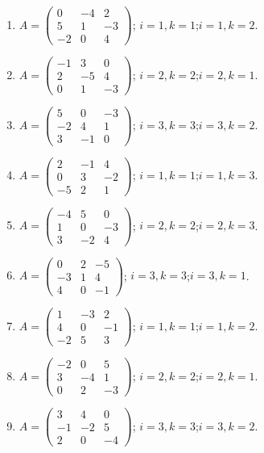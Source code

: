 \begin{enumerate}[label=\arabic*.,  leftmargin=*]
\item $A=\begin{pmatrix}0&-4&2\\5&1&-3\\-2&0&4\end{pmatrix}$; \quad $i=1, k=1$;\quad $i=1, k=2$.
\item $A=\begin{pmatrix}-1&3&0\\2&-5&4\\0&1&-3\end{pmatrix}$; \quad $i=2, k=2$;\quad $i=2, k=1$.
\item $A=\begin{pmatrix}5&0&-3\\-2&4&1\\3&-1&0\end{pmatrix}$; \quad $i=3, k=3$;\quad $i=3, k=2$.
\item $A=\begin{pmatrix}2&-1&4\\0&3&-2\\-5&2&1\end{pmatrix}$; \quad $i=1, k=1$;\quad $i=1, k=3$.
\item $A=\begin{pmatrix}-4&5&0\\1&0&-3\\3&-2&4\end{pmatrix}$; \quad $i=2, k=2$;\quad $i=2, k=3$.
\item $A=\begin{pmatrix}0&2&-5\\-3&1&4\\4&0&-1\end{pmatrix}$; \quad $i=3, k=3$;\quad $i=3, k=1$.
\item $A=\begin{pmatrix}1&-3&2\\4&0&-1\\-2&5&3\end{pmatrix}$; \quad $i=1, k=1$;\quad $i=1, k=2$.
\item $A=\begin{pmatrix}-2&0&5\\3&-4&1\\0&2&-3\end{pmatrix}$; \quad $i=2, k=2$;\quad $i=2, k=1$.
\item $A=\begin{pmatrix}3&4&0\\-1&-2&5\\2&0&-4\end{pmatrix}$; \quad $i=3, k=3$;\quad $i=3, k=2$.

\end{enumerate}
